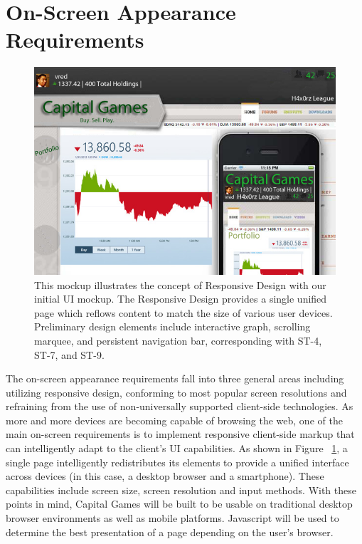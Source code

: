 \section{On-Screen Appearance Requirements}
{
\begin{figure}
\centering
\includegraphics[width=5.5in]{./img/responsiveenough.jpg}
\caption{This mockup illustrates the concept of Responsive Design with our initial UI mockup. The Responsive Design provides a single unified page which reflows content to match the size of various user devices. Preliminary design elements include interactive graph, scrolling marquee, and persistent navigation bar, corresponding with ST-4, ST-7, and ST-9.
}
\label{ui:mockup}
\end{figure}
}

The on-screen appearance requirements fall into three general areas including utilizing responsive design, conforming to most popular screen resolutions and refraining from the use of non-universally supported client-side technologies. \cite{wiki:responsive} As more and more devices are becoming capable of browsing the web, one of the main on-screen requirements is to implement responsive client-side markup that can intelligently adapt to the client’s UI capabilities. As shown in Figure ~\ref{ui:mockup}, a single page intelligently redistributes its elements to provide a unified interface across devices (in this case, a desktop browser and a smartphone). These capabilities include screen size, screen resolution and input methods. With these points in mind, Capital Games will be built to be usable on traditional desktop browser environments as well as mobile platforms. Javascript will be used to determine the best presentation of a page depending on the user’s browser. 

